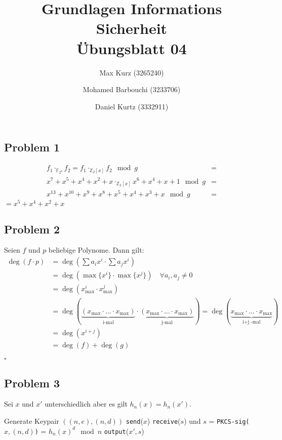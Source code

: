 \documentclass[12pt, german]{article}
\title{Grundlagen Informations Sicherheit \\ Übungsblatt 04}
\author{Max Kurz (3265240)  \and Mohamed Barbouchi (3233706) \and Daniel Kurtz (3332911)}
\date{}
\newcommand{\bewiesen}{\begin{flushright}$\square$ \end{flushright} }
\begin{document}
	\maketitle
    \subsection*{Problem 1}
    \begin{align*}
    f_1 \cdot_{\mathbb{F}_{2^{8}}} f_2 = f_1 \cdot_{\mathbb{Z}_{2}[x]} f_2 \mod g &= \\
    x^7 + x^5 + x^4 +x^2 + x \cdot_{\mathbb{Z}_{2}[x]} x^6 + x^4 +x + 1 \mod g &= \\
    x^{13}+x^{10} +x^9 + x^8 + x^5 +x^4 + x^3 +x \mod g &=
    \end{align*}
    $= x^5 + x^4 +x^2 +x$
    \subsection*{Problem 2}
    Seien $f$ und $p$ beliebige Polynome. Dann gilt:
    \begin{align*}
    	\deg(f \cdot p) &= \deg(\sum a_ix^i \cdot \sum a_j x^i) \\
    	&= \deg(\max\{x^i\} \cdot \max\{x^j\}) \quad \forall a_i, a_j \neq 0 \\
    	&= \deg(x_{\text{max}}^{i} \cdot x_{\text{max}}^{j})  \\
    	&= \deg(\underbrace{(x_{\text{max}} \cdot \ldots \cdot x_{\text{max}})}_\text{i-mal}\cdot\underbrace{(x_{\text{max}} \cdot \ldots \cdot x_{\text{max}})}_\text{j-mal}) 
    	=\deg(\underbrace{x_{\text{max}}\cdot \ldots \cdot x_{\text{max}}}_\text{i+j -mal})  \\
    	&=\deg(x^{i+j}) \\
    	&= \deg(f) + \deg(g)
    \end{align*}
    \bewiesen
    \newpage
     \subsection*{Problem 3}
     Sei $x$ und $x'$ unterschiedlich aber es gilt $h_n(x) = h_n(x')$. 
      \begin{algorithm} 
     	\centering
     	\caption{ }
     	\label{Alg:1}
     	\begin{algorithmic}[1]
     		\State Generate Keypair $((n,e),(n,d))$
     		\State \texttt{send}($x$)
     		\State \texttt{receive}($s$) und  $s$ = \texttt{PKCS-sig($x, (n,d)$)} = $h_n(x)^d\mod n$
     		\State \texttt{output}($x', s$)
     	\end{algorithmic}
       \end{algorithm}
   	
\end{document}
